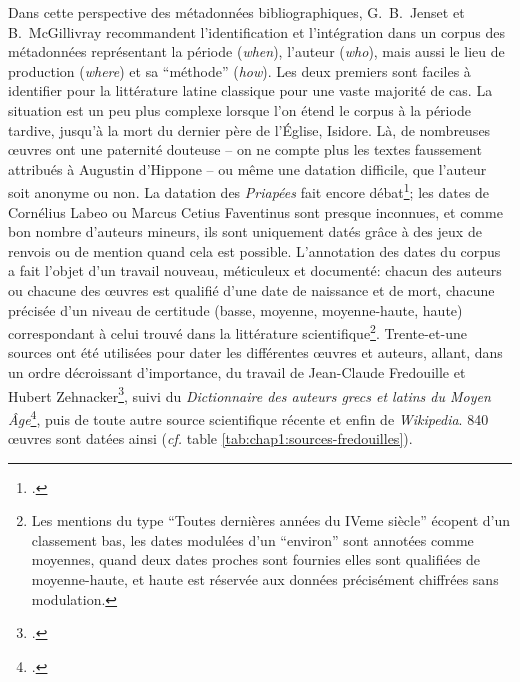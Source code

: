 Dans cette perspective des métadonnées bibliographiques, G.~B.~Jenset et B.~McGillivray recommandent l'identification et l'intégration dans un corpus des métadonnées représentant la période (\textit{when}), l'auteur (\textit{who}), mais aussi le lieu de production (\textit{where}) et sa \enquote{méthode} (\textit{how}). 
Les deux premiers sont faciles à identifier pour la littérature latine classique pour une vaste majorité de cas. La situation est un peu plus complexe lorsque l'on étend le corpus à la période tardive, jusqu'à la mort du dernier père de l'Église, Isidore. Là, de nombreuses œuvres ont une paternité douteuse -- on ne compte plus les textes faussement attribués à Augustin d'Hippone -- ou même une datation difficile, que l'auteur soit anonyme ou non. La datation des \textit{Priapées} fait encore débat\footcite{oconnor_carminis_2019}; les dates de Cornélius Labeo ou Marcus Cetius Faventinus sont presque inconnues, et comme bon nombre d'auteurs mineurs, ils sont uniquement datés grâce à des jeux de renvois ou de mention quand cela est possible. L'annotation des dates du corpus a fait l'objet d'un travail nouveau, méticuleux et documenté: chacun des auteurs ou chacune des œuvres est qualifié d'une date de naissance et de mort, chacune précisée d'un niveau de certitude (basse, moyenne, moyenne-haute, haute) correspondant à celui trouvé dans la littérature scientifique\footnote{Les mentions du type \enquote{Toutes dernières années du IVeme siècle} écopent d'un classement bas, les dates modulées d'un \enquote{environ} sont annotées comme moyennes, quand deux dates proches sont fournies elles sont qualifiées de moyenne-haute, et haute est réservée aux données précisément chiffrées sans modulation.}. Trente-et-une sources ont été utilisées pour dater les différentes œuvres et auteurs, allant, dans un ordre décroissant d'importance, du travail de Jean-Claude Fredouille et Hubert Zehnacker\footcite{zehnacker_litterature_2013}, suivi du \textit{Dictionnaire des auteurs grecs et latins du Moyen Âge}\footcite{buchwald_dictionnaire_1991}, puis de toute autre source scientifique récente et enfin de \textit{Wikipedia}. 840 œuvres sont datées ainsi (\textit{cf.} table \ref{tab:chap1:sources-fredouilles}).


